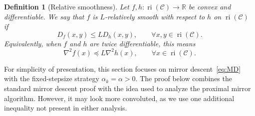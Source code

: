 \documentclass[a4paper]{article}
\renewcommand{\leq}{\leqslant}
\renewcommand{\preceq}{\preccurlyeq}
\newcommand{\CC}{\mathcal{C}}
\newcommand{\R}{\mathbb{R}}
\DeclareMathOperator{\ri}{ri}
\newtheorem{definition}{Definition}
\begin{document}
\begin{definition}[Relative smoothness]
Let \(f,h\colon\ri(\CC)\to\R\) be convex and differentiable. We say that \(f\) is
\(L\)-relatively smooth with respect to \(h\) on \(\ri(\CC)\) if
\[
        D_f(x,y)\leq L D_h(x,y),
        \qquad
        \forall x,y\in\ri(\CC).
\]
Equivalently, when \(f\) and \(h\) are twice differentiable, this means
\[
        \nabla^2 f(x)\preceq L\nabla^2h(x),
        \qquad
        \forall x\in\ri(\CC).
\]
\end{definition}

For simplicity of presentation, this section focuses on mirror descent~\eqref{eq:MD} with the fixed-stepsize strategy $\alpha_k=\alpha>0$.
The proof below combines the standard mirror descent proof with the idea used to analyze the proximal mirror algorithm.
However, it may look more convoluted, as we use one additional inequality not present in either analysis.
\end{document}
